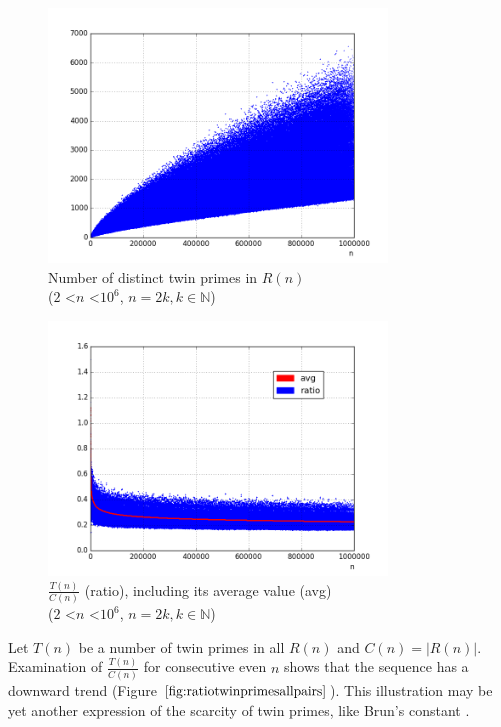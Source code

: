 \documentclass[10pt,twocolumn]{article}
\begin{document}
\begin{figure}[!ht]
\centering
\captionsetup{justification=centering}
\includegraphics[width=9cm]{f_twin_primes_all}
\caption{Number of distinct twin primes in $R(n)$ \\ ($2$ \textless $n$ \textless $10^6$, $n = 2k, k \in \mathbb{N}$)}
\label{fig:twinprimesall}
\end{figure}

\begin{figure}[!ht]
\centering
\captionsetup{justification=centering}
\includegraphics[width=9cm]{f_ratio_twin_primes_to_all_primes}
\caption{$\frac{T(n)}{C(n)}$ (ratio), including its average value (avg) \\ ($2$ \textless $n$ \textless $10^6$, $n = 2k, k \in \mathbb{N}$)}
\label{fig:ratiotwinprimesallpairs}
\end{figure}

Let $T(n)$ be a number of twin primes in all $R(n)$ and $C(n) = \left\vert{R(n)}\right\vert$. Examination of $\frac{T(n)}{C(n)}$ for consecutive even $n$ shows that the sequence has a downward trend (Figure $\ref{fig:ratiotwinprimesallpairs}$). This illustration may be yet another expression of the scarcity of twin primes, like Brun's constant \cite{brun1919}.
\end{document}
